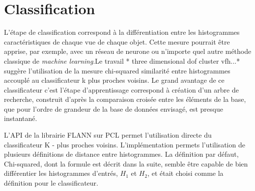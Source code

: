 \begin{figure}[H]
\end{figure}

\section {Classification} L'étape de classification correspond à la différentiation entre les
histogrammes caractéristiques de chaque vue de chaque objet. Cette
mesure pourrait être apprise, par exemple, avec un réseau de neurone
ou n'importe quel autre méthode classique de \textit{machine learning}.{\color{green}Le travail * three dimensional
  dof cluster vfh...* suggère l'utilisation de la mesure chi-squared
  similarité entre histogrammes accouplé au classificateur k plus
  proches voisins. }  Le grand avantage de ce classificateur c'est l'étape
d’apprentissage correspond à création d’un arbre de recherche,
construit d'après la comparaison croisée entre les éléments de la base,
que pour l'ordre de grandeur de la base de données envisagé, est
presque instantané.

L'API de la librairie FLANN sur PCL permet l'utilisation directe du classificateur
K - plus proches voisins. L'implémentation permets l'utilisation de plusieurs
définitions de distance entre histogrammes. La définition par défaut, Chi-squared,
dont la formule est décrit dans la suite, semble être capable de bien différentier
les histogrammes d'entrés, $H_1$ et $H_2$, et était choisi comme la définition pour le classificateur.

